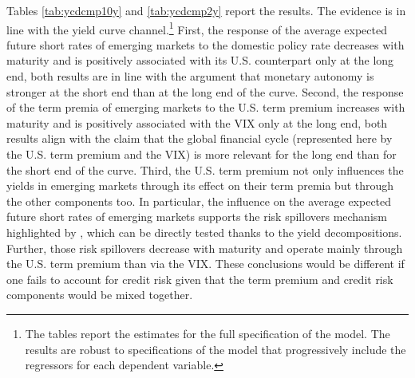 {Tables \ref{tab:ycdcmp10y} and \ref{tab:ycdcmp2y} report the results.
The evidence is in line with the yield curve channel.\footnote{ The tables report the estimates for the full specification of the model. The results are robust to specifications of the model that progressively include the regressors for each dependent variable.} 
First, the response of the average expected future short rates of emerging markets to the domestic policy rate decreases with maturity and is positively associated with its U.S. counterpart only at the long end, both results are in line with the argument that monetary autonomy is stronger at the short end than at the long end of the curve.
Second, the response of the term premia of emerging markets to the U.S. term premium increases with maturity and is positively associated with the VIX only at the long end, both results align with the claim that the global financial cycle (represented here by the U.S. term premium and the VIX) is more relevant for the long end than for the short end of the curve. 
Third, the U.S. term premium not only influences the yields in emerging markets through its effect on their term premia but through the other components too.
In particular, the influence on the average expected future short rates of emerging markets supports the risk spillovers mechanism highlighted by \cite{Kalemli-Ozcan:2019}, which can be directly tested thanks to the yield decompositions.
Further, those risk spillovers decrease with maturity and operate mainly through 
the U.S. term premium than via the VIX.
These conclusions would be different if one fails to account for credit risk given that the term premium and credit risk components would be mixed together.

%	





}
